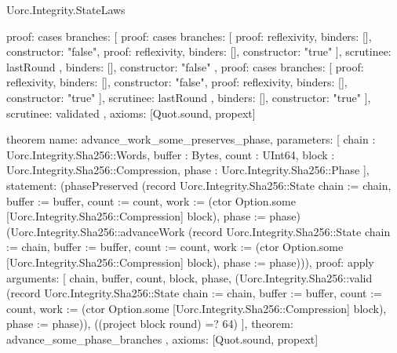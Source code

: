 \begin{lexlean}{Uorc.Integrity.StateLaws}
\begin{semanticmodule}
{  proof: cases{
    branches: [
      {
        proof: cases{
          branches: [
            {proof: reflexivity{}, binders: [], constructor: "false"},
            {proof: reflexivity{}, binders: [], constructor: "true"}
          ],
          scrutinee: lastRound
        },
        binders: [],
        constructor: "false"
      },
      {
        proof: cases{
          branches: [
            {proof: reflexivity{}, binders: [], constructor: "false"},
            {proof: reflexivity{}, binders: [], constructor: "true"}
          ],
          scrutinee: lastRound
        },
        binders: [],
        constructor: "true"
      }
    ],
    scrutinee: validated
  },
  axioms: [Quot.sound, propext]
}

theorem{
  name: advance_work_some_preserves_phase,
  parameters: [
    chain : Uorc.Integrity.Sha256::Words,
    buffer : Bytes,
    count : UInt64,
    block : Uorc.Integrity.Sha256::Compression,
    phase : Uorc.Integrity.Sha256::Phase
  ],
  statement: (phasePreserved (record Uorc.Integrity.Sha256::State {chain := chain, buffer := buffer, count := count, work := (ctor Option.some [Uorc.Integrity.Sha256::Compression] block), phase := phase}) (Uorc.Integrity.Sha256::advanceWork (record Uorc.Integrity.Sha256::State {chain := chain, buffer := buffer, count := count, work := (ctor Option.some [Uorc.Integrity.Sha256::Compression] block), phase := phase}))),
  proof: apply{
    arguments: [
      chain,
      buffer,
      count,
      block,
      phase,
      (Uorc.Integrity.Sha256::valid (record Uorc.Integrity.Sha256::State {chain := chain, buffer := buffer, count := count, work := (ctor Option.some [Uorc.Integrity.Sha256::Compression] block), phase := phase})),
      ((project block round) =? 64)
    ],
    theorem: advance_some_phase_branches
  },
  axioms: [Quot.sound, propext]
}


\end{semanticmodule}
\end{lexlean}
